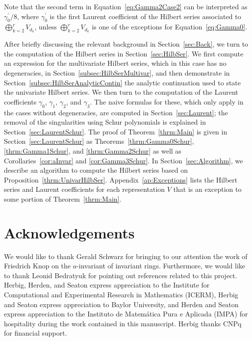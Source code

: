 \documentclass{amsart}
\theoremstyle{definition}
\theoremstyle{remark}
\begin{document}
Note that the second term in Equation~\eqref{eq:Gamma2Case2} can be interpreted as $\gamma_0^\prime/8$,
where $\gamma_0^\prime$ is the first Laurent coefficient of the Hilbert series associated to
$\bigoplus_{k=2}^r V_{d_k}$, unless $\bigoplus_{k=2}^r V_{d_k}$ is one of the exceptions for
Equation~\eqref{eq:Gamma0}.

After briefly discussing the relevant background in Section~\ref{sec:Back}, we turn to the computation
of the Hilbert series in Section~\ref{sec:HilbSer}. We first compute  an expression for the multivariate
Hilbert series, which in this case has no degeneracies, in Section~\ref{subsec:HilbSerMultivar},
and then demonstrate in Section~\ref{subsec:HilbSerAnalyticContin} the analytic continuation used to
state the univariate Hilbert series. We then turn to the computation of the Laurent coefficients
$\gamma_0$, $\gamma_1$, $\gamma_2$, and $\gamma_3$. The naive formulas for these, which only apply in the cases without
degeneracies, are computed in Section~\ref{sec:Laurent}; the removal of the singularities using
Schur polynomials is explained in Section~\ref{sec:LaurentSchur}.
The proof of Theorem~\ref{thrm:Main} is given in Section~\ref{sec:LaurentSchur} as
Theorems~\ref{thrm:Gamma0Schur}, \ref{thrm:Gamma1Schur}, and \ref{thrm:Gamma2Schur}
as well as Corollaries~\ref{cor:aInvar} and \ref{cor:Gamma3Schur}.
In Section~\ref{sec:Algorithm}, we describe an algorithm to compute the Hilbert series
based on Proposition~\ref{thrm:UnivarHilbSer}. Appendix~\ref{ap:Exceptions} lists
the Hilbert series and Laurent coefficients for each representation $V$ that is
an exception to some portion of Theorem~\ref{thrm:Main}.



\section*{Acknowledgements}
We would like to thank Gerald Schwarz for bringing to our attention the work of Friedrich Knop on the $a$-invariant
of invariant rings. Furthermore, we would like to thank Leonid Bedratyuk for pointing out references related to
this project. Herbig, Herden, and Seaton express appreciation to the Institute for Computational and Experimental
Research in Mathematics (ICERM), Herbig and Seaton express appreciation to Baylor University, and Herden
and Seaton express appreciation to the Instituto de Matem\'{a}tica Pura e Aplicada (IMPA) for
hospitality during the work contained in this manuscript. Herbig thanks CNPq for financial support.
\end{document}
